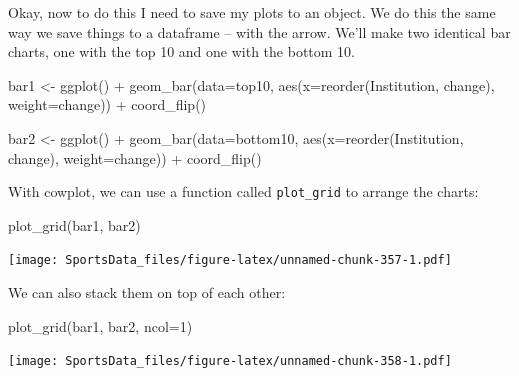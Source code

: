 \documentclass[
]{book}
\newenvironment{Shaded}{\begin{snugshade}}{\end{snugshade}}
\newcommand{\AttributeTok}[1]{\textcolor[rgb]{0.77,0.63,0.00}{#1}}
\newcommand{\DecValTok}[1]{\textcolor[rgb]{0.00,0.00,0.81}{#1}}
\newcommand{\FunctionTok}[1]{\textcolor[rgb]{0.00,0.00,0.00}{#1}}
\newcommand{\NormalTok}[1]{#1}
\newcommand{\OtherTok}[1]{\textcolor[rgb]{0.56,0.35,0.01}{#1}}
\newcommand{\SpecialCharTok}[1]{\textcolor[rgb]{0.00,0.00,0.00}{#1}}
\begin{document}
Okay, now to do this I need to save my plots to an object. We do this the same way we save things to a dataframe -- with the arrow. We'll make two identical bar charts, one with the top 10 and one with the bottom 10.

\begin{Shaded}
\begin{Highlighting}[]
\NormalTok{bar1 }\OtherTok{\textless{}{-}} \FunctionTok{ggplot}\NormalTok{() }\SpecialCharTok{+} \FunctionTok{geom\_bar}\NormalTok{(}\AttributeTok{data=}\NormalTok{top10, }\FunctionTok{aes}\NormalTok{(}\AttributeTok{x=}\FunctionTok{reorder}\NormalTok{(Institution, change), }\AttributeTok{weight=}\NormalTok{change)) }\SpecialCharTok{+} \FunctionTok{coord\_flip}\NormalTok{()}
\end{Highlighting}
\end{Shaded}

\begin{Shaded}
\begin{Highlighting}[]
\NormalTok{bar2 }\OtherTok{\textless{}{-}} \FunctionTok{ggplot}\NormalTok{() }\SpecialCharTok{+} \FunctionTok{geom\_bar}\NormalTok{(}\AttributeTok{data=}\NormalTok{bottom10, }\FunctionTok{aes}\NormalTok{(}\AttributeTok{x=}\FunctionTok{reorder}\NormalTok{(Institution, change), }\AttributeTok{weight=}\NormalTok{change)) }\SpecialCharTok{+} \FunctionTok{coord\_flip}\NormalTok{()}
\end{Highlighting}
\end{Shaded}

With cowplot, we can use a function called \texttt{plot\_grid} to arrange the charts:

\begin{Shaded}
\begin{Highlighting}[]
\FunctionTok{plot\_grid}\NormalTok{(bar1, bar2) }
\end{Highlighting}
\end{Shaded}

\texttt{[image: SportsData\_files/figure-latex/unnamed-chunk-357-1.pdf]}

We can also stack them on top of each other:

\begin{Shaded}
\begin{Highlighting}[]
\FunctionTok{plot\_grid}\NormalTok{(bar1, bar2, }\AttributeTok{ncol=}\DecValTok{1}\NormalTok{) }
\end{Highlighting}
\end{Shaded}

\texttt{[image: SportsData\_files/figure-latex/unnamed-chunk-358-1.pdf]}
\end{document}
